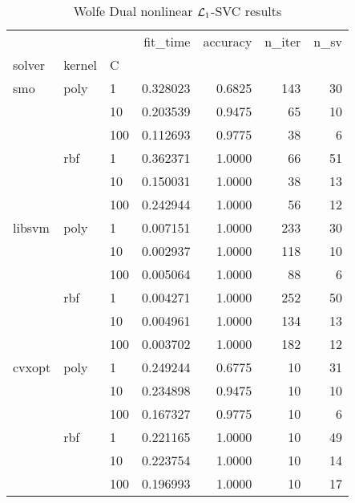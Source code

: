 \begin{table}[H]
\centering
\caption{Wolfe Dual nonlinear $\protect \mathcal{L}_1$-SVC results}
\label{nonlinear_dual_l1_svc_cv_results}
\begin{tabular}{lllrrrr}
\toprule
       &     &     &  fit\_time &  accuracy &  n\_iter &  n\_sv \\
solver & kernel & C &           &           &         &       \\
\midrule
smo & poly & 1   &  0.328023 &    0.6825 &     143 &    30 \\
       &     & 10  &  0.203539 &    0.9475 &      65 &    10 \\
       &     & 100 &  0.112693 &    0.9775 &      38 &     6 \\
       & rbf & 1   &  0.362371 &    1.0000 &      66 &    51 \\
       &     & 10  &  0.150031 &    1.0000 &      38 &    13 \\
       &     & 100 &  0.242944 &    1.0000 &      56 &    12 \\
libsvm & poly & 1   &  0.007151 &    1.0000 &     233 &    30 \\
       &     & 10  &  0.002937 &    1.0000 &     118 &    10 \\
       &     & 100 &  0.005064 &    1.0000 &      88 &     6 \\
       & rbf & 1   &  0.004271 &    1.0000 &     252 &    50 \\
       &     & 10  &  0.004961 &    1.0000 &     134 &    13 \\
       &     & 100 &  0.003702 &    1.0000 &     182 &    12 \\
cvxopt & poly & 1   &  0.249244 &    0.6775 &      10 &    31 \\
       &     & 10  &  0.234898 &    0.9475 &      10 &    10 \\
       &     & 100 &  0.167327 &    0.9775 &      10 &     6 \\
       & rbf & 1   &  0.221165 &    1.0000 &      10 &    49 \\
       &     & 10  &  0.223754 &    1.0000 &      10 &    14 \\
       &     & 100 &  0.196993 &    1.0000 &      10 &    17 \\
\bottomrule
\end{tabular}
\end{table}
